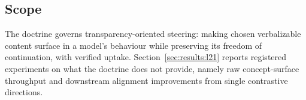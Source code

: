\subsection{Scope}

The doctrine governs transparency-oriented steering: making chosen verbalizable content surface in a model's behaviour while preserving its freedom of continuation, with verified uptake. Section~\ref{sec:results:l21} reports registered experiments on what the doctrine does not provide, namely raw concept-surface throughput and downstream alignment improvements from single contrastive directions.
